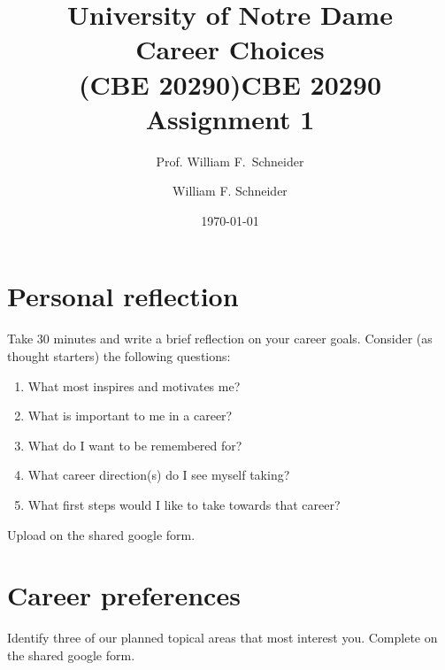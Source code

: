 \documentclass[11pt]{article}
\title{University of Notre Dame\\Career Choices\\(CBE 20290)}
\author{Prof. William F.\ Schneider}
\author{William F. Schneider}
\date{\today}
\title{CBE 20290 Assignment 1}
\begin{document}
\begin{OPTIONS}
\end{OPTIONS}
\section{Personal reflection}
\label{sec:org2227b91}
Take 30 minutes and write a brief reflection on your career goals. Consider (as thought starters) the following questions:

\begin{enumerate}
\item What most inspires and motivates me?
\item What is important to me in a career?
\item What do I want to be remembered for?
\item What career direction(s) do I see myself taking?
\item What first steps would I like to take towards that career?
\end{enumerate}

Upload on the shared google form.

\section{Career preferences}
\label{sec:orgff40df3}
Identify three of our planned topical areas that most interest you. Complete on the shared google form.
\end{document}
